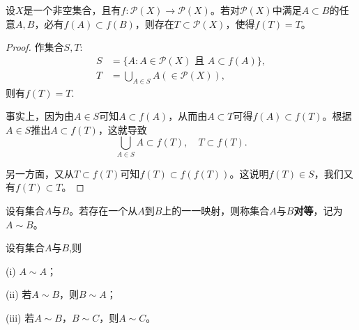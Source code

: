 \documentclass[lang=cn,newtx,10pt,scheme=chinese]{../Template/elegantbook}
\begin{document}
\begin{example}[单调映射的不动点]\label{example:单调映射的不动点}
设\(X\)是一个非空集合，且有\(f:\mathcal{P}(X)\to\mathcal{P}(X)\)。若对\(\mathcal{P}(X)\)中满足\(A\subset B\)的任意\(A,B\)，必有\(f(A)\subset f(B)\)，则存在\(T\subset\mathcal{P}(X)\)，使得\(f(T)=T\)。
\end{example}
\begin{proof}
作集合\(S,T\):
\begin{align*}
S&=\{A:A\in\mathcal{P}(X)\text{ 且 }A\subset f(A)\},\\
T&=\bigcup_{A\in S}A(\in\mathcal{P}(X)),
\end{align*}
则有\(f(T)=T\).

事实上，因为由\(A\in S\)可知\(A\subset f(A)\)，从而由\(A\subset T\)可得\(f(A)\subset f(T)\)。根据\(A\in S\)推出\(A\subset f(T)\)，这就导致
\[
\bigcup_{A\in S}A\subset f(T),\quad T\subset f(T).
\]

另一方面，又从\(T\subset f(T)\)可知\(f(T)\subset f(f(T))\)。这说明\(f(T)\in S\)，我们又有\(f(T)\subset T\)。

\end{proof}

\begin{definition}[集合之间的对等关系]\label{definition:集合之间的对等关系}
  设有集合\(A\)与\(B\)。若存在一个从\(A\)到\(B\)上的一一映射，则称集合\(A\)与\(B\)\textbf{对等}，记为\(A\sim B\)。
\end{definition}

\begin{proposition}[对等关系的基本性质]\label{proposition:对等关系的基本性质}
设有集合\(A\)与\(B\),则

  (i) \(A\sim A\)；

(ii) 若\(A\sim B\)，则\(B\sim A\)；

(iii) 若\(A\sim B\)，\(B\sim C\)，则\(A\sim C\)。
\end{proposition}
\end{document}
